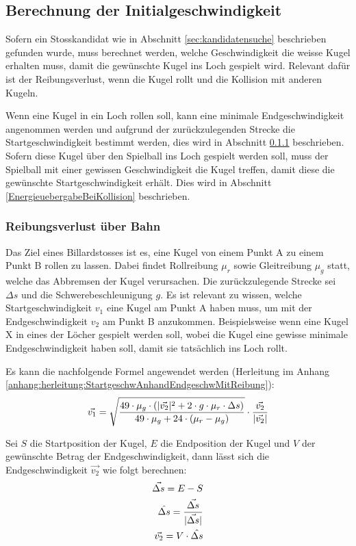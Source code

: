 \subsection{Berechnung der Initialgeschwindigkeit}\label{sec:initialgeschwindigkeit}
Sofern ein Stosskandidat wie in Abschnitt \ref{sec:kandidatensuche} beschrieben gefunden wurde, muss berechnet werden,
welche Geschwindigkeit die weisse Kugel erhalten muss, damit die gewünschte Kugel ins Loch gespielt wird.
Relevant dafür ist der Reibungsverlust, wenn die Kugel rollt und die Kollision mit anderen Kugeln.

Wenn eine Kugel in ein Loch rollen soll, kann eine minimale Endgeschwindigkeit angenommen werden und aufgrund
der zurückzulegenden Strecke die Startgeschwindigkeit bestimmt werden, dies wird in Abschnitt \ref{ReibungsverlustUeberBahn} beschrieben.
Sofern diese Kugel über den Spielball ins Loch gespielt werden soll, muss der Spielball mit einer gewissen
Geschwindigkeit die Kugel treffen, damit diese die gewünschte Startgeschwindigkeit erhält.
Dies wird in Abschnitt \ref{EnergieuebergabeBeiKollision} beschrieben.

\subsubsection{Reibungsverlust über Bahn}\label{ReibungsverlustUeberBahn}
Das Ziel eines Billardstosses ist es, eine Kugel von einem Punkt A zu einem Punkt B rollen zu lassen.
Dabei findet Rollreibung $\mu_r$ sowie Gleitreibung $\mu_g$ statt, welche das Abbremsen der Kugel verursachen.
Die zurückzulegende Strecke sei $\Delta s$ und die Schwerebeschleunigung $g$.
Es ist relevant zu wissen, welche Startgeschwindigkeit $v_1$ eine Kugel am Punkt A haben muss,
um mit der Endgeschwindigkeit $v_2$ am Punkt B anzukommen.
Beispielsweise wenn eine Kugel X in eines der Löcher gespielt werden soll,
wobei die Kugel eine gewisse minimale Endgeschwindigkeit haben soll, damit sie tatsächlich ins Loch rollt.

Es kann die nachfolgende Formel angewendet werden (Herleitung im Anhang \ref{anhang:herleitung:StartgeschwAnhandEndgeschwMitReibung}):
\begin{align}
    \vec{v_1} = \sqrt{\frac{49 \cdot \mu_g \cdot (\lvert \vec{v_2} \rvert^2 + 2 \cdot g \cdot \mu_r \cdot \Delta s)}{49 \cdot \mu_g + 24 \cdot (\mu_r - \mu_g)}} \cdot \frac{\vec{v_2}}{\lvert \vec{v_2} \rvert}
\end{align}

Sei $S$ die Startposition der Kugel, $E$ die Endposition der Kugel und $V$ der gewünschte Betrag der Endgeschwindigkeit,
dann lässt sich die Endgeschwindigkeit $\vec{v_2}$ wie folgt berechnen:
\begin{align}
    \vec{\Delta s} = E - S\\
    \hat{\Delta s} = \frac{\vec{\Delta s}}{\lvert \vec{\Delta s} \rvert}\\
    \vec{v_2} = V \cdot \hat{\Delta s}
\end{align}

